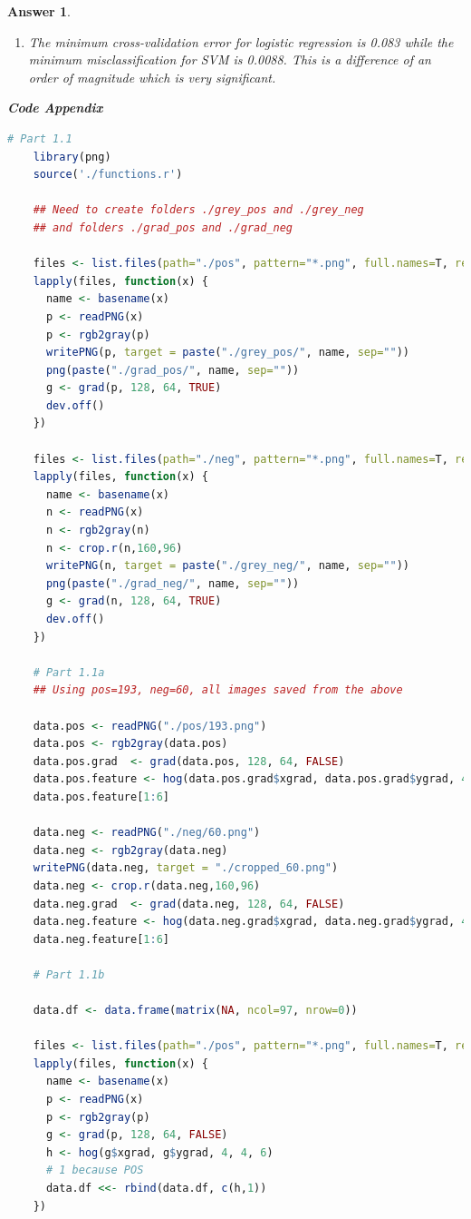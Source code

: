 \documentclass[12pt]{article}
\theoremstyle{colon}
\newtheorem*{answer}{Answer}
\begin{document}
\begin{answer}
\begin{enumerate}[label=\arabic*)]
\begin{enumerate}[label=\arabic*)]
        \item The minimum cross-validation error for logistic regression is 0.083 while the minimum misclassification for SVM is 0.0088. This is a difference of an order of magnitude which is very significant.
      \end{enumerate}
  \end{enumerate}

  \textbf{Code Appendix}

  \begin{lstlisting}[language=R, basicstyle=\scriptsize, breaklines=true]
    # Part 1.1
    library(png)
    source('./functions.r')

    ## Need to create folders ./grey_pos and ./grey_neg
    ## and folders ./grad_pos and ./grad_neg

    files <- list.files(path="./pos", pattern="*.png", full.names=T, recursive=FALSE)
    lapply(files, function(x) {
      name <- basename(x)
      p <- readPNG(x)
      p <- rgb2gray(p)
      writePNG(p, target = paste("./grey_pos/", name, sep=""))
      png(paste("./grad_pos/", name, sep=""))
      g <- grad(p, 128, 64, TRUE)
      dev.off()
    })

    files <- list.files(path="./neg", pattern="*.png", full.names=T, recursive=FALSE)
    lapply(files, function(x) {
      name <- basename(x)
      n <- readPNG(x)
      n <- rgb2gray(n)
      n <- crop.r(n,160,96)
      writePNG(n, target = paste("./grey_neg/", name, sep=""))
      png(paste("./grad_neg/", name, sep=""))
      g <- grad(n, 128, 64, TRUE)
      dev.off()
    })

    # Part 1.1a
    ## Using pos=193, neg=60, all images saved from the above

    data.pos <- readPNG("./pos/193.png")
    data.pos <- rgb2gray(data.pos)
    data.pos.grad  <- grad(data.pos, 128, 64, FALSE)
    data.pos.feature <- hog(data.pos.grad$xgrad, data.pos.grad$ygrad, 4, 4, 6)
    data.pos.feature[1:6]

    data.neg <- readPNG("./neg/60.png")
    data.neg <- rgb2gray(data.neg)
    writePNG(data.neg, target = "./cropped_60.png")
    data.neg <- crop.r(data.neg,160,96)
    data.neg.grad  <- grad(data.neg, 128, 64, FALSE)
    data.neg.feature <- hog(data.neg.grad$xgrad, data.neg.grad$ygrad, 4, 4, 6)
    data.neg.feature[1:6]

    # Part 1.1b

    data.df <- data.frame(matrix(NA, ncol=97, nrow=0))

    files <- list.files(path="./pos", pattern="*.png", full.names=T, recursive=FALSE)
    lapply(files, function(x) {
      name <- basename(x)
      p <- readPNG(x)
      p <- rgb2gray(p)
      g <- grad(p, 128, 64, FALSE)
      h <- hog(g$xgrad, g$ygrad, 4, 4, 6)
      # 1 because POS
      data.df <<- rbind(data.df, c(h,1))
    })


\end{lstlisting}
\end{answer}
\end{document}
